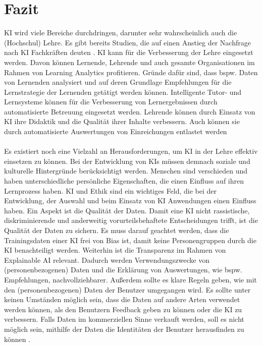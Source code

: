 \chapter{Fazit}
KI wird viele Bereiche durchdringen, darunter sehr wahrscheinlich auch die (Hochschul) Lehre.
Es gibt bereits Studien, die auf einen Anstieg der Nachfrage nach KI Fachkräften deuten \cite[S. 26]{Witt.2020}.
KI kann für die Verbesserung der Lehre eingesetzt werden. Davon können Lernende, Lehrende und auch gesamte Organisationen im Rahmen von Learning Analytics profitieren.
Gründe dafür sind, dass bspw. Daten von Lernenden analysiert und auf deren Grundlage Empfehlungen für die Lernstrategie der Lernenden getätigt werden können. %
Intelligente Tutor- und Lernsysteme können für die Verbesserung von Lernergebnissen durch automatisierte Betreuung eingesetzt werden. %
Lehrende können durch Einsatz von KI ihre Didaktik und die Qualität ihrer Inhalte verbessern.
Auch können sie durch automatisierte Auswertungen von Einreichungen entlastet werden \cite[S. 14ff]{Witt.2020}
\\
\\ \noindent
Es existiert noch eine Vielzahl an Herausforderungen, um KI in der Lehre effektiv einsetzen zu können.
Bei der Entwicklung von KIs müssen demnach soziale und kulturelle Hintergründe berücksichtigt werden.
Menschen sind verschieden und haben unterschiedliche persönliche Eigenschaften, die einen Einfluss auf ihren Lernprozess haben. \cite[S. 9ff]{Witt.2020}
KI und Ethik sind ein wichtiges Feld, die bei der Entwicklung, der Auswahl und beim Einsatz von KI Anwendungen einen Einfluss haben.
Ein Aspekt ist die Qualität der Daten. Damit eine KI nicht rassistische, diskriminierende und anderweitig vorurteilsbehaftete Entscheidungen trifft, ist die Qualität der Daten zu sichern.
Es muss darauf geachtet werden, dass die Trainingsdaten einer KI frei von Bias ist, damit keine Personengruppen durch die KI benachteiligt werden. \cite[S. 39]{Witt.2020}
Weiterhin ist die Transparenz im Rahmen von Explainable AI relevant. Dadurch werden Verwendungszwecke von (personenbezogenen) Daten und die Erklärung von Auswertungen, wie bspw. Empfehlungen, nachvollziehbarer. \cite[S.10f; S. 39ff]{Witt.2020}
Außerdem sollte es klare Regeln geben, wie mit den (personenbezogenen) Daten der Benutzer umgegangen wird.
Es sollte unter keinen Umständen möglich sein, dass die Daten auf andere Arten verwendet werden können, als den Benutzern Feedback geben zu können oder die KI zu verbessern.
Falls Daten im kommerziellen Sinne verkauft werden, soll es nicht möglich sein, mithilfe der Daten die Identitäten der Benutzer herausfinden zu können \cite[S. 8f]{Pinkwart.2016}.
